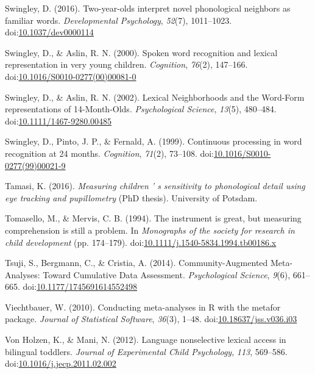 \documentclass[man]{apa6}
\begin{document}
\leavevmode\hypertarget{ref-Swingley2016}{}%
Swingley, D. (2016). Two-year-olds interpret novel phonological neighbors as familiar words. \emph{Developmental Psychology}, \emph{52}(7), 1011--1023. doi:\href{https://doi.org/10.1037/dev0000114}{10.1037/dev0000114}

\leavevmode\hypertarget{ref-Swingley2000}{}%
Swingley, D., \& Aslin, R. N. (2000). Spoken word recognition and lexical representation in very young children. \emph{Cognition}, \emph{76}(2), 147--166. doi:\href{https://doi.org/10.1016/S0010-0277(00)00081-0}{10.1016/S0010-0277(00)00081-0}

\leavevmode\hypertarget{ref-Swingley2002}{}%
Swingley, D., \& Aslin, R. N. (2002). Lexical Neighborhoods and the Word-Form representations of 14-Month-Olds. \emph{Psychological Science}, \emph{13}(5), 480--484. doi:\href{https://doi.org/10.1111/1467-9280.00485}{10.1111/1467-9280.00485}

\leavevmode\hypertarget{ref-Swingley1999}{}%
Swingley, D., Pinto, J. P., \& Fernald, A. (1999). Continuous processing in word recognition at 24 months. \emph{Cognition}, \emph{71}(2), 73--108. doi:\href{https://doi.org/10.1016/S0010-0277(99)00021-9}{10.1016/S0010-0277(99)00021-9}

\leavevmode\hypertarget{ref-Tamasi2016}{}%
Tamasi, K. (2016). \emph{Measuring children ' s sensitivity to phonological detail using eye tracking and pupillometry} (PhD thesis). University of Potsdam.

\leavevmode\hypertarget{ref-Tomasello1994}{}%
Tomasello, M., \& Mervis, C. B. (1994). The instrument is great, but measuring comprehension is still a problem. In \emph{Monographs of the society for research in child development} (pp. 174--179). doi:\href{https://doi.org/10.1111/j.1540-5834.1994.tb00186.x}{10.1111/j.1540-5834.1994.tb00186.x}

\leavevmode\hypertarget{ref-Tsuji2014}{}%
Tsuji, S., Bergmann, C., \& Cristia, A. (2014). Community-Augmented Meta-Analyses: Toward Cumulative Data Assessment. \emph{Psychological Science}, \emph{9}(6), 661--665. doi:\href{https://doi.org/10.1177/1745691614552498}{10.1177/1745691614552498}

\leavevmode\hypertarget{ref-metafor}{}%
Viechtbauer, W. (2010). Conducting meta-analyses in R with the metafor package. \emph{Journal of Statistical Software}, \emph{36}(3), 1--48. doi:\href{https://doi.org/10.18637/jss.v036.i03}{10.18637/jss.v036.i03}

\leavevmode\hypertarget{ref-VonHolzen2012}{}%
Von Holzen, K., \& Mani, N. (2012). Language nonselective lexical access in bilingual toddlers. \emph{Journal of Experimental Child Psychology}, \emph{113}, 569--586. doi:\href{https://doi.org/10.1016/j.jecp.2011.02.002}{10.1016/j.jecp.2011.02.002}
\end{document}
